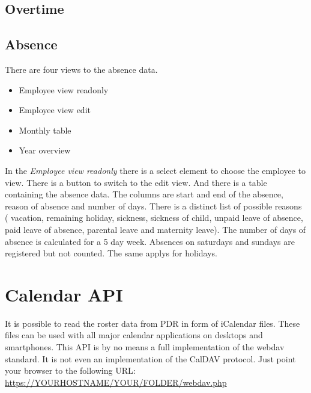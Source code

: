 \subsection{Overtime}
\subsection{Absence}
There are four views to the absence data.
\begin{itemize}
\item Employee view readonly
\item Employee view edit
\item Monthly table
\item Year overview
\end{itemize}
In the \emph{Employee view readonly} there is a select element to choose the employee to view. There is a button to switch to the edit view.
And there is a table containing the absence data. The columns are start and end of the absence, reason of absence and number of days.
There is a distinct list of possible reasons ( vacation,
        remaining holiday,
       sickness,
        sickness of child,
        unpaid leave of absence,
        paid leave of absence,
        parental leave and
        maternity leave).
The number of days of absence is calculated for a 5 day week. Absences on saturdays and sundays are registered but not counted. The same applys for holidays.

\section{Calendar API}
It is possible to read the roster data from PDR in form of iCalendar files.
These files can be used with all major calendar applications on desktops and smartphones.
This API is by no means a full implementation of the webdav standard. It is not even an implementation of the CalDAV protocol.
Just point your browser to the following URL:
\url{https://YOURHOSTNAME/YOUR/FOLDER/webdav.php}


